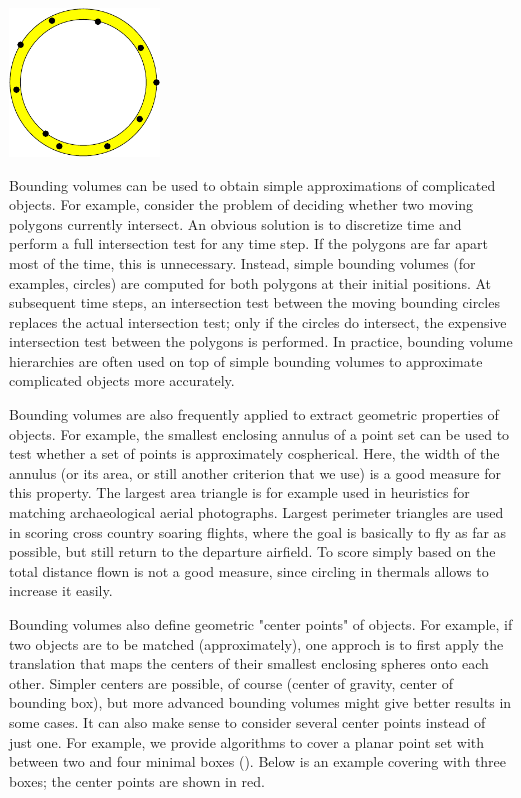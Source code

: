 \begin{ccTexOnly}
\begin{center}
\includegraphics[width=4cm]{Bounding_volumes/annulus}
\end{center}
\end{ccTexOnly}

Bounding volumes can be used to obtain simple approximations of
complicated objects. For example, consider the problem of deciding
whether two moving polygons currently intersect. An obvious solution
is to discretize time and perform a full intersection test for any
time step. If the polygons are far apart most of the time, this is
unnecessary. Instead, simple bounding volumes (for examples, circles)
are computed for both polygons at their initial positions. At
subsequent time steps, an intersection test between the moving
bounding circles replaces the actual intersection test; only if the
circles do intersect, the expensive intersection test between the
polygons is performed. In practice, bounding volume hierarchies are
often used on top of simple bounding volumes to approximate
complicated objects more accurately.


Bounding volumes are also frequently applied to extract
geometric properties of objects. For example, the smallest enclosing
annulus of a point set can be used to test whether a set of points is
approximately cospherical. Here, the width of the annulus (or its
area, or still another criterion that we use) is a good measure for
this property. The largest area triangle is for example used in
heuristics for matching archaeological aerial photographs. Largest
perimeter triangles are used in scoring cross country soaring flights,
where the goal is basically to fly as far as possible, but still
return to the departure airfield. To score simply based on the total
distance flown is not a good measure, since circling in thermals
allows to increase it easily.

Bounding volumes also define geometric "center points" of objects.
For example, if two objects are to be matched (approximately), one
approch is to first apply the translation that maps the centers of
their smallest enclosing spheres onto each other.  Simpler centers are
possible, of course (center of gravity, center of bounding box), but
more advanced bounding volumes might give better results in some
cases. It can also make sense to consider several center points
instead of just one. For example, we provide algorithms to cover a
planar point set with between two and four minimal boxes
(). Below is an example covering with
three boxes; the center points are shown in red.

